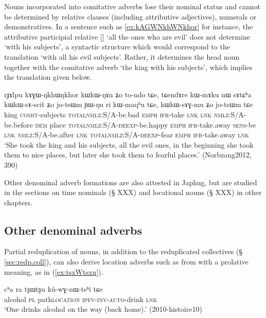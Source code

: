 Nouns incorporated into comitative adverbs lose their nominal status and cannot be determined by relative clauses (including attributive adjectives), numerals or demonstratives. In a sentence such as \ref{ex:kAGWNkhWNkhor} for instance, the attributive participial relative [] `all the ones who are evil' does not determine  `with his subjects', a syntactic structure which would correspond to the translation `with all his evil subjects'. Rather, it determines the head noun together with the comitative adverb    `the king with his subjects', which implies the translation given below.

\begin{exe}
\ex \label{ex:kAGWNkhWNkhor}
\gll rɟɤlpu 	kɤɣɯ-ŋkhɯ\tld{}ŋkhor 	kɯ\tld{}kɯ-ŋɤn  	ʑo 	to-ndo 	tɕe, 	tɕendɤre 	kɯ-mɤku 	nɯ 	sɤtɕʰa 	kɯ\tld{}kɯ-sɤ-scit 	ʑo 	jo-tsɯm 	ɲɯ-ŋu 	ri 	kɯ-maqʰu 	tɕe, 	kɯ\tld{}kɯ-sɤɣ-mu 	ʑo 	jo-tsɯm 	tɕe \\
king \textsc{comit}-subjects \textsc{total}\tld{}\textsc{nmlz}:S/A-be.bad \textsc{emph} \textsc{ifr}-take \textsc{lnk}  \textsc{lnk} \textsc{nmlz}:S/A-be.before \textsc{dem} place \textsc{total}\tld{}\textsc{nmlz}:S/A-\textsc{deexp}-be.happy \textsc{emph} \textsc{ifr}-take.away \textsc{sens}-be \textsc{lnk} \textsc{nmlz}:S/A-be.after \textsc{lnk} \textsc{total}\tld{}\textsc{nmlz}:S/A-\textsc{deexp}-fear \textsc{emph} \textsc{ifr}-take.away \textsc{lnk} \\
\glt `She took the king and his subjects, all the evil ones, in the beginning she took them to nice places, but later she took them to fearful places.' (Norbzang2012, 390)
\end{exe}

Other denominal adverb formations are also attested in Japhug, but are studied in the sections on time nominals (§ XXX) and locational nouns (§  XXX) in other chapters.


\subsection{Other denominal adverbs} \label{sec:other.denominal.adverbs}
Partial reduplication of nouns, in addition to the reduplicated collectives (§ \ref{sec:redp.coll}), can also derive location adverbs such as  from  with a prolative meaning, as in (\ref{ex:tsxWtsxu}).

\begin{exe}
\ex \label{ex:tsxWtsxu}
\gll cʰa ra tʂɯ\redp{}tʂu kú-wɣ-nɯ-tsʰi tɕe \\
alcohol \textsc{pl} path\redp{}\textsc{location}  \textsc{ipfv}-\textsc{inv}-\textsc{auto}-drink \textsc{lnk} \\
\glt `One drinks alcohol on the way (back home).' (2010-histoire10)
\end{exe}
